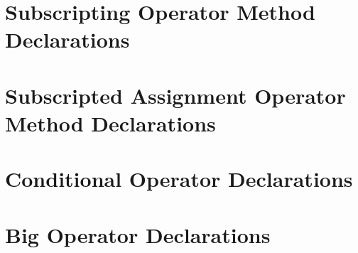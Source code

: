%
%
%
%

\section{Subscripting Operator Method Declarations}
\section{Subscripted Assignment Operator Method Declarations}
\section{Conditional Operator Declarations}
\section{Big Operator Declarations}
